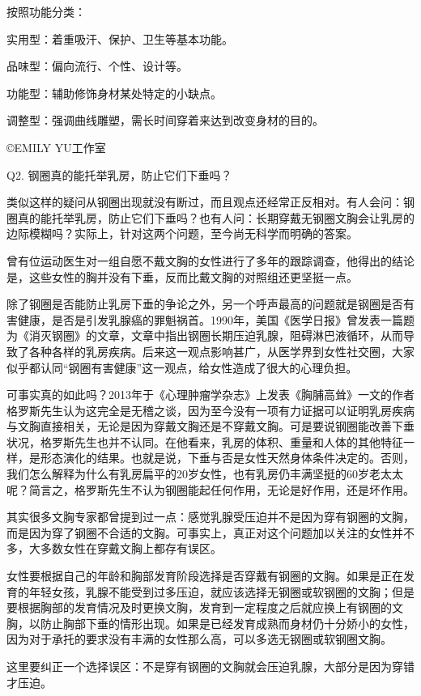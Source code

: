 \documentclass[12pt,UTF8]{ctexbook}
\begin{document}
按照功能分类：

实用型：着重吸汗、保护、卫生等基本功能。

品味型：偏向流行、个性、设计等。

功能型：辅助修饰身材某处特定的小缺点。

调整型：强调曲线雕塑，需长时间穿着来达到改变身材的目的。

©EMILY YU工作室





Q2. 钢圈真的能托举乳房，防止它们下垂吗？


类似这样的疑问从钢圈出现就没有断过，而且观点还经常正反相对。有人会问：钢圈真的能托举乳房，防止它们下垂吗？也有人问：长期穿戴无钢圈文胸会让乳房的边际模糊吗？实际上，针对这两个问题，至今尚无科学而明确的答案。

曾有位运动医生对一组自愿不戴文胸的女性进行了多年的跟踪调查，他得出的结论是，这些女性的胸并没有下垂，反而比戴文胸的对照组还更坚挺一点。


除了钢圈是否能防止乳房下垂的争论之外，另一个呼声最高的问题就是钢圈是否有害健康，是否是引发乳腺癌的罪魁祸首。1990年，美国《医学日报》曾发表一篇题为《消灭钢圈》的文章，文章中指出钢圈长期压迫乳腺，阻碍淋巴液循环，从而导致了各种各样的乳房疾病。后来这一观点影响甚广，从医学界到女性社交圈，大家似乎都认同“钢圈有害健康”这一观点，给女性造成了很大的心理负担。

可事实真的如此吗？2013年于《心理肿瘤学杂志》上发表《胸脯高耸》一文的作者格罗斯先生认为这完全是无稽之谈，因为至今没有一项有力证据可以证明乳房疾病与文胸直接相关，无论是因为穿戴文胸还是不穿戴文胸。可是要说钢圈能改善下垂状况，格罗斯先生也并不认同。在他看来，乳房的体积、重量和人体的其他特征一样，是形态演化的结果。也就是说，下垂与否是女性天然身体条件决定的。否则，我们怎么解释为什么有乳房扁平的20岁女性，也有乳房仍丰满坚挺的60岁老太太呢？简言之，格罗斯先生不认为钢圈能起任何作用，无论是好作用，还是坏作用。

其实很多文胸专家都曾提到过一点：感觉乳腺受压迫并不是因为穿有钢圈的文胸，而是因为穿了钢圈不合适的文胸。可事实上，真正对这个问题加以关注的女性并不多，大多数女性在穿戴文胸上都存有误区。


女性要根据自己的年龄和胸部发育阶段选择是否穿戴有钢圈的文胸。如果是正在发育的年轻女孩，乳腺不能受到过多压迫，就应该选择无钢圈或软钢圈的文胸；但是要根据胸部的发育情况及时更换文胸，发育到一定程度之后就应换上有钢圈的文胸，以防止胸部下垂的情形出现。如果是已经发育成熟而身材仍十分娇小的女性，因为对于承托的要求没有丰满的女性那么高，可以多选无钢圈或软钢圈文胸。

这里要纠正一个选择误区：不是穿有钢圈的文胸就会压迫乳腺，大部分是因为穿错才压迫。
\end{document}
